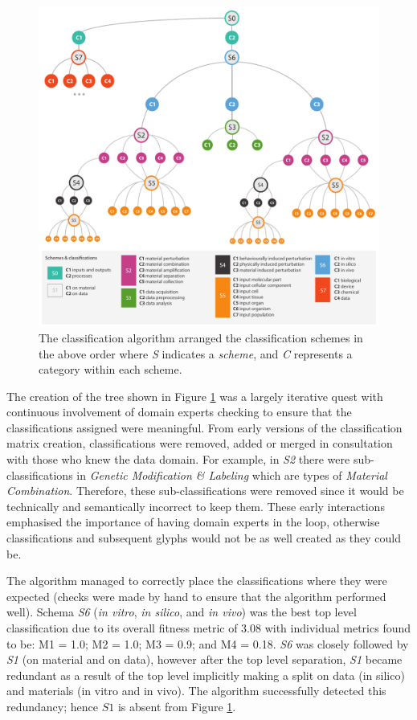 \begin{figure}[ht!]
\centering
\includegraphics[width=\textwidth]{images/glyph-taxonomy/fitness-classification}
\caption{The classification algorithm arranged the classification schemes in the above order where \emph{S} indicates a \emph{scheme}, and \emph{C} represents a category within each scheme.}
\label{fig:fitness-classification}
\vspace{-10pt}
\end{figure}

The creation of the tree shown in Figure \ref{fig:fitness-classification} was a largely iterative quest with continuous involvement of domain experts checking to ensure that the classifications assigned were meaningful. From early versions of the classification matrix creation, classifications were removed, added or merged in consultation with those who knew the data domain. For example, in \emph{S2} there were sub-classifications in \emph{Genetic Modification \& Labeling} which are types of \emph{Material Combination}. Therefore, these sub-classifications were removed since it would be technically and semantically incorrect to keep them. These early interactions emphasised the importance of having domain experts in the loop, otherwise classifications and subsequent glyphs would not be as well created as they could be.

The algorithm managed to correctly place the classifications where they were expected (checks were made by hand to ensure that the algorithm performed well).
Schema \emph{S6} (\emph{in vitro}, \emph{in silico}, and \emph{in vivo}) was the best top level classification due to its overall fitness metric of 3.08 with individual metrics found to be: M1 = 1.0; M2 = 1.0; M3 = 0.9; and M4 = 0.18.
\emph{S6} was closely followed by \emph{S1} (on material and on data), however after the top level separation, \emph{S1} became redundant as a result of the top level implicitly making a split on data (in silico) and materials (in vitro and in vivo). The algorithm successfully detected this redundancy; hence $S1$ is absent from Figure \ref{fig:fitness-classification}. 

